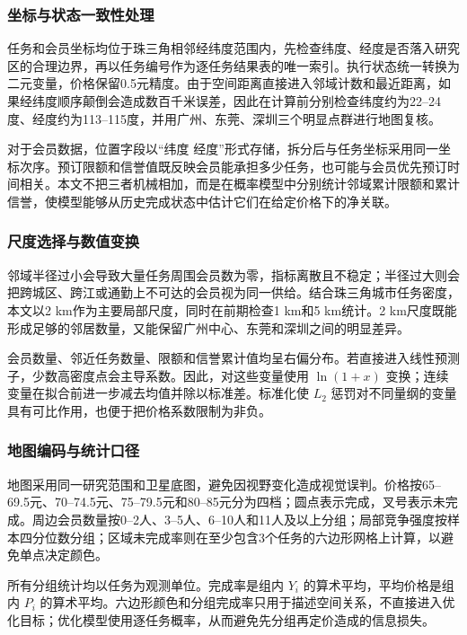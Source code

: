 ﻿\documentclass[UTF8,zihao=-4,a4paper,fontset=fandol]{ctexart}
\begin{document}
\subsubsection{坐标与状态一致性处理}

任务和会员坐标均位于珠三角相邻经纬度范围内，先检查纬度、经度是否落入研究区的合理边界，再以任务编号作为逐任务结果表的唯一索引。执行状态统一转换为二元变量，价格保留0.5元精度。由于空间距离直接进入邻域计数和最近距离，如果经纬度顺序颠倒会造成数百千米误差，因此在计算前分别检查纬度约为22--24度、经度约为113--115度，并用广州、东莞、深圳三个明显点群进行地图复核。

对于会员数据，位置字段以“纬度 经度”形式存储，拆分后与任务坐标采用同一坐标次序。预订限额和信誉值既反映会员能承担多少任务，也可能与会员优先预订时间相关。本文不把三者机械相加，而是在概率模型中分别统计邻域累计限额和累计信誉，使模型能够从历史完成状态中估计它们在给定价格下的净关联。

\subsubsection{尺度选择与数值变换}

邻域半径过小会导致大量任务周围会员数为零，指标离散且不稳定；半径过大则会把跨城区、跨江或通勤上不可达的会员视为同一供给。结合珠三角城市任务密度，本文以2 km作为主要局部尺度，同时在前期检查1 km和5 km统计。2 km尺度既能形成足够的邻居数量，又能保留广州中心、东莞和深圳之间的明显差异。

会员数量、邻近任务数量、限额和信誉累计值均呈右偏分布。若直接进入线性预测子，少数高密度点会主导系数。因此，对这些变量使用 $\ln(1+x)$ 变换；连续变量在拟合前进一步减去均值并除以标准差。标准化使 $L_2$ 惩罚对不同量纲的变量具有可比作用，也便于把价格系数限制为非负。

\subsubsection{地图编码与统计口径}

地图采用同一研究范围和卫星底图，避免因视野变化造成视觉误判。价格按65--69.5元、70--74.5元、75--79.5元和80--85元分为四档；圆点表示完成，叉号表示未完成。周边会员数量按0--2人、3--5人、6--10人和11人及以上分组；局部竞争强度按样本四分位数分组；区域未完成率则在至少包含3个任务的六边形网格上计算，以避免单点决定颜色。

所有分组统计均以任务为观测单位。完成率是组内 $Y_i$ 的算术平均，平均价格是组内 $P_i$ 的算术平均。六边形颜色和分组完成率只用于描述空间关系，不直接进入优化目标；优化模型使用逐任务概率，从而避免先分组再定价造成的信息损失。
\end{document}
